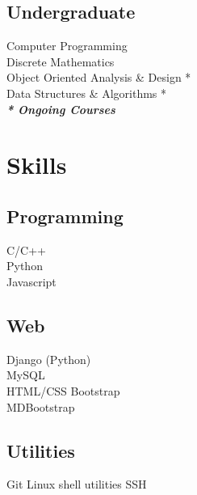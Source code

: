 \documentclass[]{deedy-resume-openfont}
\begin{document}
\begin{minipage}[t]{0.30\textwidth}

\subsection{Undergraduate}
Computer Programming \\
Discrete Mathematics \\
Object Oriented Analysis \& Design * \\
Data Structures \& Algorithms * \\
{\footnotesize \textit{\textbf{* Ongoing Courses}}}
\sectionsep


\section{Skills}
\subsection{Programming}
\textbullet{}   C/C++  \\
\textbullet{} Python \\
\textbullet{} Javascript 
\sectionsep

\subsection{Web}
\textbullet{} Django (Python) \\ \textbullet{} MySQL \\ 
\textbullet{} HTML/CSS \textbullet{} Bootstrap \\ 
\textbullet{} MDBootstrap \\
\sectionsep

\subsection{Utilities}
 \textbullet{} Git \textbullet{} Linux shell utilities \textbullet{} SSH
\sectionsep

\end{minipage}
\end{document}
